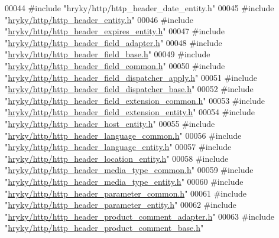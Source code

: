 \begin{DoxyCode}
00044 \textcolor{preprocessor}{#include "hryky/http/http\_header\_date\_entity.h"}
00045 \textcolor{preprocessor}{#include "\hyperlink{http__header__entity_8h}{hryky/http/http_header_entity.h}"}
00046 \textcolor{preprocessor}{#include "\hyperlink{http__header__expires__entity_8h}{hryky/http/http_header_expires_entity.h}"}
00047 \textcolor{preprocessor}{#include "\hyperlink{http__header__field__adapter_8h}{hryky/http/http_header_field_adapter.h}"}
00048 \textcolor{preprocessor}{#include "\hyperlink{http__header__field__base_8h}{hryky/http/http_header_field_base.h}"}
00049 \textcolor{preprocessor}{#include "\hyperlink{http__header__field__common_8h}{hryky/http/http_header_field_common.h}"}
00050 \textcolor{preprocessor}{#include "\hyperlink{http__header__field__dispatcher__apply_8h}{hryky/http/http_header_field_dispatcher_apply.h}"}
00051 \textcolor{preprocessor}{#include "\hyperlink{http__header__field__dispatcher__base_8h}{hryky/http/http_header_field_dispatcher_base.h}"}
00052 \textcolor{preprocessor}{#include "\hyperlink{http__header__field__extension__common_8h}{hryky/http/http_header_field_extension_common.h}"}
00053 \textcolor{preprocessor}{#include "\hyperlink{http__header__field__extension__entity_8h}{hryky/http/http_header_field_extension_entity.h}"}
00054 \textcolor{preprocessor}{#include "\hyperlink{http__header__host__entity_8h}{hryky/http/http_header_host_entity.h}"}
00055 \textcolor{preprocessor}{#include "\hyperlink{http__header__language__common_8h}{hryky/http/http_header_language_common.h}"}
00056 \textcolor{preprocessor}{#include "\hyperlink{http__header__language__entity_8h}{hryky/http/http_header_language_entity.h}"}
00057 \textcolor{preprocessor}{#include "\hyperlink{http__header__location__entity_8h}{hryky/http/http_header_location_entity.h}"}
00058 \textcolor{preprocessor}{#include "\hyperlink{http__header__media__type__common_8h}{hryky/http/http_header_media_type_common.h}"}
00059 \textcolor{preprocessor}{#include "\hyperlink{http__header__media__type__entity_8h}{hryky/http/http_header_media_type_entity.h}"}
00060 \textcolor{preprocessor}{#include "\hyperlink{http__header__parameter__common_8h}{hryky/http/http_header_parameter_common.h}"}
00061 \textcolor{preprocessor}{#include "\hyperlink{http__header__parameter__entity_8h}{hryky/http/http_header_parameter_entity.h}"}
00062 \textcolor{preprocessor}{#include "\hyperlink{http__header__product__comment__adapter_8h}{hryky/http/http_header_product_comment_adapter.h}"}
00063 \textcolor{preprocessor}{#include "\hyperlink{http__header__product__comment__base_8h}{hryky/http/http_header_product_comment_base.h}"}

\end{DoxyCode}
